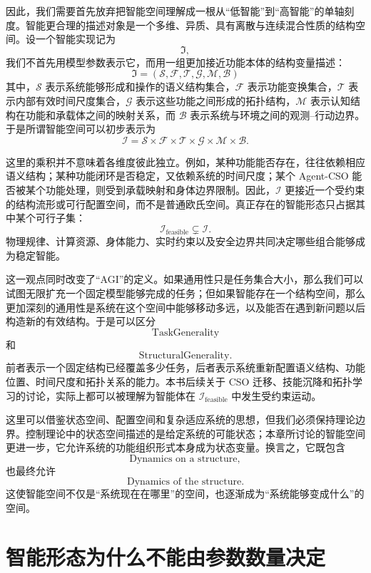 因此，我们需要首先放弃把智能空间理解成一根从“低智能”到“高智能”的单轴刻度。智能更合理的描述对象是一个多维、异质、具有离散与连续混合性质的结构空间。设一个智能实现记为
\[
\mathfrak I,
\]
我们不首先用模型参数表示它，而用一组更加接近功能本体的结构变量描述：
\[
\boxed{
\mathfrak I
=
\left(
\mathcal S,
\mathcal F,
\mathcal T,
\mathcal G,
\mathcal M,
\mathcal B
\right)
}
\]
其中，$\mathcal S$ 表示系统能够形成和操作的语义结构集合，$\mathcal F$ 表示功能变换集合，$\mathcal T$ 表示内部有效时间尺度集合，$\mathcal G$ 表示这些功能之间形成的拓扑结构，$\mathcal M$ 表示认知结构在功能和承载体之间的映射关系，而 $\mathcal B$ 表示系统与环境之间的观测--行动边界。于是所谓智能空间可以初步表示为
\[
\boxed{
\mathscr I
=
\mathscr S
\times
\mathscr F
\times
\mathscr T
\times
\mathscr G
\times
\mathscr M
\times
\mathscr B .
}
\]

这里的乘积并不意味着各维度彼此独立。例如，某种功能能否存在，往往依赖相应语义结构；某种功能闭环是否稳定，又依赖系统的时间尺度；某个 Agent-CSO 能否被某个功能处理，则受到承载映射和身体边界限制。因此，$\mathscr I$ 更接近一个受约束的结构流形或可行配置空间，而不是普通欧氏空间。真正存在的智能形态只占据其中某个可行子集：
\[
\mathscr I_{\mathrm{feasible}}
\subsetneq
\mathscr I.
\]
物理规律、计算资源、身体能力、实时约束以及安全边界共同决定哪些组合能够成为稳定智能。

这一观点同时改变了“AGI”的定义。如果通用性只是任务集合大小，那么我们可以试图无限扩充一个固定模型能够完成的任务；但如果智能存在一个结构空间，那么更加深刻的通用性是系统在这个空间中能够移动多远，以及能否在遇到新问题以后构造新的有效结构。于是可以区分
\[
\mathrm{TaskGenerality}
\]
和
\[
\mathrm{StructuralGenerality}.
\]
前者表示一个固定结构已经覆盖多少任务，后者表示系统重新配置语义结构、功能位置、时间尺度和拓扑关系的能力。本书后续关于 CSO 迁移、技能沉降和拓扑学习的讨论，实际上都可以被理解为智能体在 $\mathscr I_{\mathrm{feasible}}$ 中发生受约束运动。

这里可以借鉴状态空间、配置空间和复杂适应系统的思想，但我们必须保持理论边界。控制理论中的状态空间描述的是给定系统的可能状态；本章所讨论的智能空间更进一步，它允许系统的功能组织形式本身成为状态变量。换言之，它既包含
\[
\text{Dynamics on a structure},
\]
也最终允许
\[
\text{Dynamics of the structure}.
\]
这使智能空间不仅是“系统现在在哪里”的空间，也逐渐成为“系统能够变成什么”的空间。

\section{智能形态为什么不能由参数数量决定}

